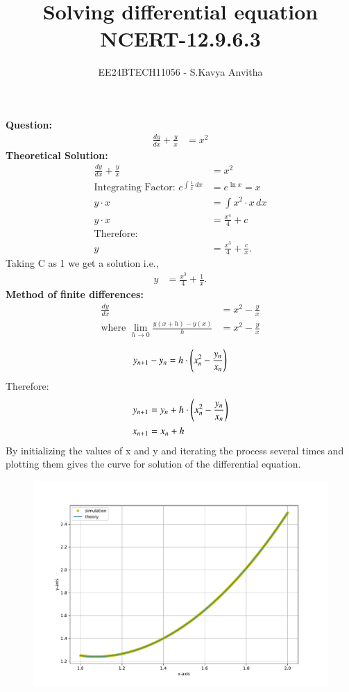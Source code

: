 \documentclass[journal]{IEEEtran}
\begin{document}

\vspace{3cm}

\title{Solving differential equation\\NCERT-12.9.6.3}
\author{EE24BTECH11056 - S.Kavya Anvitha}
\maketitle
\bigskip

\renewcommand{\thefigure}{\theenumi}
\renewcommand{\thetable}{\theenumi}
\textbf{Question:}
\begin{align}
\frac{dy}{dx}+\frac{y}{x} &= x^2
\end{align}
\textbf{Theoretical Solution:}
\begin{align}
    \frac{dy}{dx} + \frac{y}{x} &= x^2 \\
    \text{Integrating Factor: }
    e^{\int \frac{1}{x} \,dx} &= e^{\ln{x}} = x \\
    y \cdot x &= \int x^2 \cdot x \,dx \\
    y \cdot x &= \frac{x^4}{4} + c \\
    \text{Therefore:}\\
    y &= \frac{x^3}{4} + \frac{c}{x}.
\end{align}
Taking C as 1 we get a solution i.e.,
\begin{align}
y &= \frac{x^3}{4} + \frac{1}{x}.
\end{align}
\textbf{Method of finite differences:}
\begin{align}
    \frac{dy}{dx} &= x^2 - \frac{y}{x} \\
    \text{where } \lim_{h \to 0} \frac{y(x+h) - y(x)}{h} &= x^2 - \frac{y}{x} \\
    \end{align}
    \begin{align}
    y_{n+1} - y_n &= h \cdot \left(x_{n}^2 - \frac{y_n}{x_n}\right) \\
    \end{align}
    Therefore:
    \begin{align}
    y_{n+1} &= y_n + h \cdot \left(x_{n}^2 - \frac{y_n}{x_n}\right) \\
    x_{n+1} &= x_n + h
\end{align}
By initializing the values of x and y and iterating the process several times and plotting
them gives the curve for solution of the differential equation.
\begin{figure}[h!]
   \centering
   \includegraphics[width=\columnwidth]{figs/combined_plot.pdf}
\end{figure}
\end{document}
